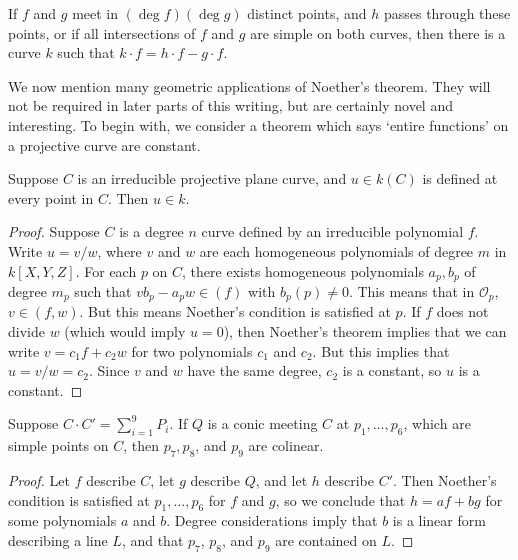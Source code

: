 \begin{corollary}
    If $f$ and $g$ meet in $(\deg f)(\deg g)$ distinct points, and $h$ passes through these points, or if all intersections of $f$ and $g$ are simple on both curves, then there is a curve $k$ such that $k \cdot f = h \cdot f - g \cdot f$.
\end{corollary}

We now mention many geometric applications of Noether's theorem. They will not be required in later parts of this writing, but are certainly novel and interesting. To begin with, we consider a theorem which says `entire functions' on a projective curve are constant.

\begin{theorem}
    Suppose $C$ is an irreducible projective plane curve, and $u \in k(C)$ is defined at every point in $C$. Then $u \in k$.
\end{theorem}
\begin{proof}
    Suppose $C$ is a degree $n$ curve defined by an irreducible polynomial $f$. Write $u = v/w$, where $v$ and $w$ are each homogeneous polynomials of degree $m$ in $k[X,Y,Z]$. For each $p$ on $C$, there exists homogeneous polynomials $a_p,b_p$ of degree $m_p$ such that $vb_p - a_pw \in (f)$ with $b_p(p) \neq 0$. This means that in $\mathcal{O}_p$, $v \in (f,w)$. But this means Noether's condition is satisfied at $p$. If $f$ does not divide $w$ (which would imply $u = 0$), then Noether's theorem implies that we can write $v = c_1f + c_2w$ for two polynomials $c_1$ and $c_2$. But this implies that $u = v/w = c_2$. Since $v$ and $w$ have the same degree, $c_2$ is a constant, so $u$ is a constant.
\end{proof}

\begin{theorem}
    Suppose $C \cdot C' = \sum_{i = 1}^9 P_i$. If $Q$ is a conic meeting $C$ at $p_1, \dots, p_6$, which are simple points on $C$, then $p_7, p_8$, and $p_9$ are colinear.
\end{theorem}
\begin{proof}
    Let $f$ describe $C$, let $g$ describe $Q$, and let $h$ describe $C'$. Then Noether's condition is satisfied at $p_1,\dots,p_6$ for $f$ and $g$, so we conclude that $h = af + bg$ for some polynomials $a$ and $b$. Degree considerations imply that $b$ is a linear form describing a line $L$, and that $p_7$, $p_8$, and $p_9$ are contained on $L$.
\end{proof}


